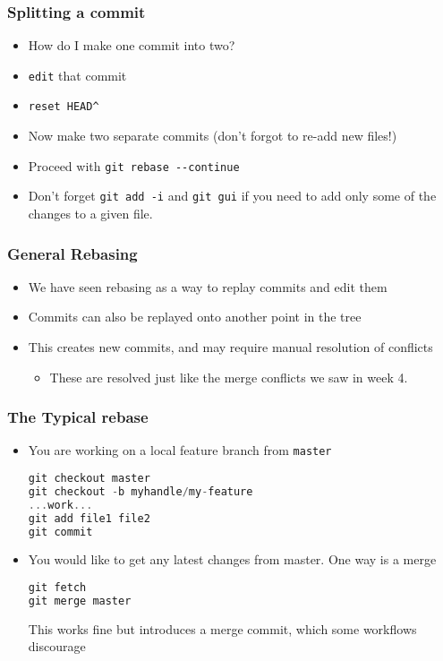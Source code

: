 \documentclass{beamer}
\begin{document}
\begin{frame}[fragile]
\frametitle{Splitting a commit}
\begin{itemize}
\item How do I make one commit into two?
\item \texttt{edit} that commit
\item \lstinline{reset HEAD^}
\item Now make two separate commits (don't forgot to re-add new files!)
\item Proceed with \lstinline{git rebase --continue}
\item Don't forget \lstinline{git add -i} and \lstinline{git gui} if you need to add only some of the changes to a given file.
\end{itemize}
\end{frame}

\begin{frame}[fragile]
\frametitle{General Rebasing}
\begin{itemize}
\item We have seen rebasing as a way to replay commits and edit them
\item Commits can also be replayed onto another point in the tree
\item This creates new commits, and may require manual resolution of conflicts
\begin{itemize}
\item These are resolved just like the merge conflicts we saw in week 4.
\end{itemize}
\end{itemize}
\end{frame}

\begin{frame}[fragile]
\frametitle{The Typical rebase}
\begin{itemize}
\item You are working on a local feature branch from \texttt{master}
\begin{lstlisting}[language=C++]
git checkout master
git checkout -b myhandle/my-feature
...work...
git add file1 file2
git commit
\end{lstlisting}
\item You would like to get any latest changes from master. One way is a merge
\begin{lstlisting}[language=C++]
git fetch
git merge master
\end{lstlisting}
This works fine but introduces a merge commit, which some workflows discourage
\end{itemize}
\end{frame}
\end{document}
